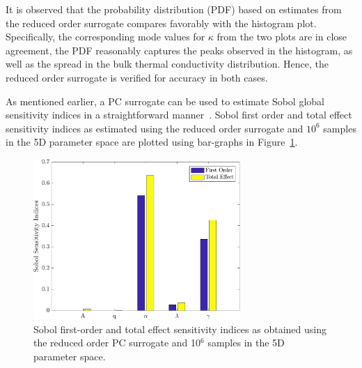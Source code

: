It is observed that the probability distribution (PDF) based on estimates from the reduced order surrogate compares
favorably with the histogram plot. Specifically, the corresponding mode values for $\kappa$ from the two plots are
in close agreement, the PDF reasonably captures the peaks observed in the histogram, as well as the spread in
the bulk thermal conductivity distribution. 
Hence, the reduced order surrogate is verified for accuracy in both cases. 
\bigskip

As mentioned earlier, a PC surrogate can be used to estimate Sobol global sensitivity indices in a 
straightforward manner~\cite{Sudret:2008}. Sobol first order and total effect sensitivity indices as estimated
using the reduced order surrogate and $10^{6}$ samples in the 5D parameter space are plotted using bar-graphs in
Figure~\ref{fig:gsa}. 

\begin{figure}[htbp]
 \begin{center}
  \includegraphics[width=0.70\textwidth]{./Figures/PCE5D_gsa}
\caption{Sobol first-order and total effect sensitivity indices as obtained using the reduced order PC
surrogate and 10$^{6}$ samples in the 5D parameter space. }
\label{fig:gsa}
\end{center}
\end{figure}

